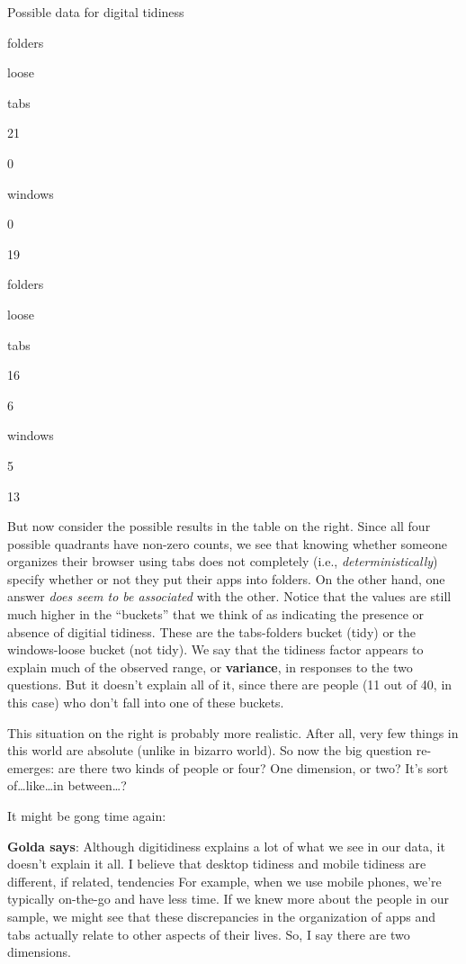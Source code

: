 \documentclass[]{book}
\begin{document}
\label{tab:tabsxapps}Possible data for digital tidiness

folders

loose

tabs

21

0

windows

0

19

folders

loose

tabs

16

6

windows

5

13

But now consider the possible results in the table on the right. Since all four possible quadrants have non-zero counts, we see that knowing whether someone organizes their browser using tabs does not completely (i.e., \emph{deterministically}) specify whether or not they put their apps into folders. On the other hand, one answer \emph{does seem to be associated} with the other. Notice that the values are still much higher in the ``buckets'' that we think of as indicating the presence or absence of digitial tidiness. These are the tabs-folders bucket (tidy) or the windows-loose bucket (not tidy). We say that the tidiness factor appears to explain much of the observed range, or \textbf{variance}, in responses to the two questions. But it doesn't explain all of it, since there are people (11 out of 40, in this case) who don't fall into one of these buckets.

This situation on the right is probably more realistic. After all, very few things in this world are absolute (unlike in bizarro world). So now the big question re-emerges: are there two kinds of people or four? One dimension, or two? It's sort of\ldots{}like\ldots{}in between\ldots{}?

It might be gong time again:

\textbf{Golda says}: Although digitidiness explains a lot of what we see in our data, it doesn't explain it all. I believe that desktop tidiness and mobile tidiness are different, if related, tendencies For example, when we use mobile phones, we're typically on-the-go and have less time. If we knew more about the people in our sample, we might see that these discrepancies in the organization of apps and tabs actually relate to other aspects of their lives. So, I say there are two dimensions.
\end{document}
